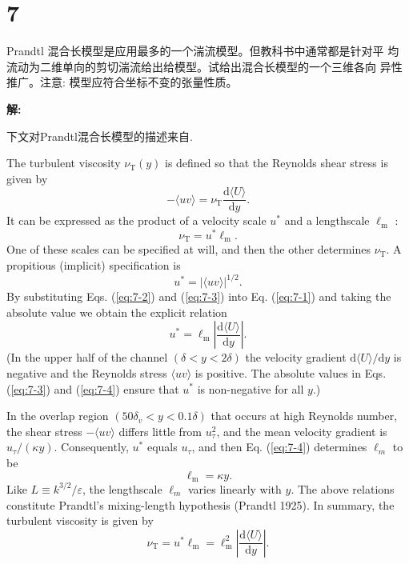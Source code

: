 \documentclass[12pt,a4]{ctexart}
\begin{document}
\section{7}

Prandtl 混合长模型是应用最多的一个湍流模型。但教科书中通常都是针对平
均流动为二维单向的剪切湍流给出给模型。试给出混合长模型的一个三维各向
异性推广。注意: 模型应符合坐标不变的张量性质。


\textsf{\hspace{-2em}\sf  \textbf{解:}}

下文对Prandtl混合长模型的描述来自\cite{pop}.

The turbulent viscosity $\nu_{\mathrm{T}}(y)$ is defined so that the Reynolds shear stress is given by
\begin{equation}
   -\langle u v\rangle= \nu_{\mathrm{T}} \frac{\mathrm{d}\langle U\rangle}{\mathrm{d} y} .
   \label{eq:7-1}
\end{equation}
It can be expressed as the product of a velocity scale $u^{*}$ and a lengthscale $\ell_{\mathrm{m}}$ :
\begin{equation}
   \nu_{\mathrm{T}}=u^{*} \ell_{\mathrm{m}} .
   \label{eq:7-2}
\end{equation}
One of these scales can be specified at will, and then the other determines $\nu_{\mathrm{T}}$. A propitious (implicit) specification is
\begin{equation}
   u^{*}=|\langle u v\rangle|^{1 / 2} .
   \label{eq:7-3}
\end{equation}
By substituting Eqs. (\ref{eq:7-2}) and (\ref{eq:7-3}) into Eq. (\ref{eq:7-1}) and taking the absolute value we obtain the explicit relation
\begin{equation}
   u^{*}=\ell_{\mathrm{m}}\left|\frac{\mathrm{d}\langle U\rangle}{\mathrm{d} y}\right| .
   \label{eq:7-4}
\end{equation}
(In the upper half of the channel $(\delta<y<2 \delta)$ the velocity gradient $\mathrm{d}\langle U\rangle / \mathrm{d} y$ is negative and the Reynolds stress $\langle u v\rangle$ is positive. The absolute values in Eqs. (\ref{eq:7-3}) and (\ref{eq:7-4}) ensure that $u^{*}$ is non-negative for all $y$.)

In the overlap region $\left(50 \delta_{v}<y<0.1 \delta\right)$ that occurs at high Reynolds number, the shear stress $-\langle u v\rangle$ differs little from $u_{\tau}^{2}$, and the mean velocity gradient is $u_{\tau} /(\kappa y)$. Consequently, $u^{*}$ equals $u_{\tau}$, and then Eq. (\ref{eq:7-4}) determines $\ell_{m}$ to be
\begin{equation}
   \ell_{\mathrm{m}}=\kappa y .
\end{equation}
Like $L \equiv k^{3 / 2} / \varepsilon$, the lengthscale $\ell_{m}$ varies linearly with $y .$
The above relations constitute Prandtl's mixing-length hypothesis (Prandtl 1925). In summary, the turbulent viscosity is given by
\begin{equation}
   \nu_{\mathrm{T}}=u^{*} \ell_{\mathrm{m}}=\ell_{\mathrm{m}}^{2}\left|\frac{\mathrm{d}\langle U\rangle}{\mathrm{d} y}\right|.
\end{equation}
\end{document}
